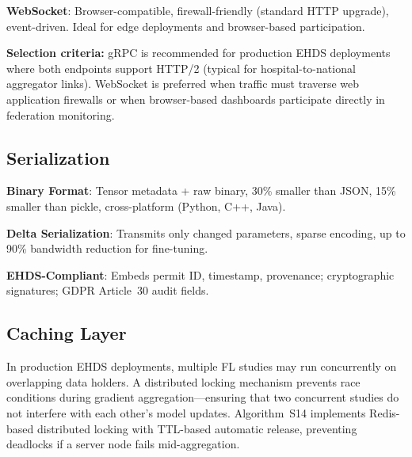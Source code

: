 \documentclass[conference]{IEEEtran}
\begin{document}
\textbf{WebSocket}: Browser-compatible, firewall-friendly (standard HTTP upgrade), event-driven. Ideal for edge deployments and browser-based participation.

\textbf{Selection criteria:} gRPC is recommended for production EHDS deployments where both endpoints support HTTP/2 (typical for hospital-to-national aggregator links). WebSocket is preferred when traffic must traverse web application firewalls or when browser-based dashboards participate directly in federation monitoring.

\subsection{Serialization}

\textbf{Binary Format}: Tensor metadata + raw binary, 30\% smaller than JSON, 15\% smaller than pickle, cross-platform (Python, C++, Java).

\textbf{Delta Serialization}: Transmits only changed parameters, sparse encoding, up to 90\% bandwidth reduction for fine-tuning.

\textbf{EHDS-Compliant}: Embeds permit ID, timestamp, provenance; cryptographic signatures; GDPR Article~30 audit fields.

\subsection{Caching Layer}

In production EHDS deployments, multiple FL studies may run concurrently on overlapping data holders. A distributed locking mechanism prevents race conditions during gradient aggregation---ensuring that two concurrent studies do not interfere with each other's model updates. Algorithm~S14 implements Redis-based distributed locking with TTL-based automatic release, preventing deadlocks if a server node fails mid-aggregation.

\begin{figure}[htbp]
\centering
{}
\end{figure}
\end{document}
